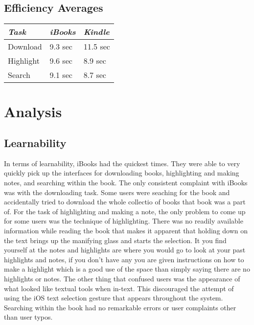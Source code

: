 \documentclass[journal,letterpaper]{article}
\begin{document}
    \subsection{Efficiency Averages}
    \begin{center}
        \centering
        \begin{tabular}{|l||l|l|}
            \hline
            \emph{Task} & \emph{iBooks} & \emph{Kindle} \\
            \hline
            Download & 9.3 sec & 11.5 sec \\
            \hline
            Highlight & 9.6 sec & 8.9 sec \\
            \hline
            Search & 9.1 sec & 8.7 sec \\
        \end{tabular}
    \end{center}

    \section{Analysis}
    \label{Analysis}

    \subsection{Learnability}
    In terms of learnability, iBooks had the quickest times. They were able to very quickly pick up the interfaces for downloading books, highlighting and making notes, and searching within the book. The only consistent complaint with iBooks was with the downloading task. Some users were seaching for the book and accidentally tried to download the whole collectio of books that book was a part of. For the task of highlighting and making a note, the only problem to come up for some users was the technique of highlighting. There was no readily available information while reading the book that makes it apparent that holding down on the text brings up the manifying glass and starts the selection. It you find yourself at the notes and highlights are where you would go to look at your past highlights and notes, if you don't have any you are given instructions on how to make a highlight which is a good use of the space than simply saying there are no highlights or notes. The other thing that confused users was the appearance of what looked like textual tools when in-text. This discouraged the attempt of using the iOS text selection gesture that appears throughout the system. Searching within the book had no remarkable errors or user complaints other than user typos. 
\end{document}
